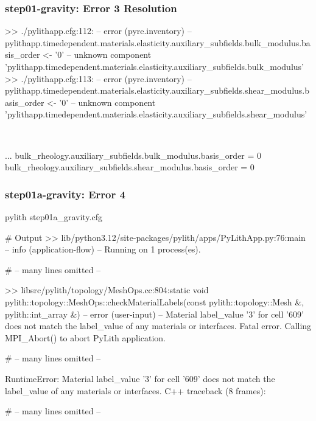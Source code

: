 \documentclass[aspectratio=169]{beamer}
\begin{document}
\begin{frame}[t,fragile]
  \frametitle{{\ttfamily step01-gravity}: Error 3 Resolution}

  \tserror
  \begin{pyrejournal}
 >> ./pylithapp.cfg:112:
 -- error (pyre.inventory)
 -- pylithapp.timedependent.materials.elasticity.auxiliary_subfields.bulk_modulus.basis_order <- '0'
 -- unknown component 'pylithapp.timedependent.materials.elasticity.auxiliary_subfields.bulk_modulus'
 >> ./pylithapp.cfg:113:
 -- error (pyre.inventory)
 -- pylithapp.timedependent.materials.elasticity.auxiliary_subfields.shear_modulus.basis_order <- '0'
 -- unknown component 'pylithapp.timedependent.materials.elasticity.auxiliary_subfields.shear_modulus'
  \end{pyrejournal}

  \pause\\[1pt]

  \begin{cfgcode}
    ...
    bulk_rheology.auxiliary_subfields.bulk_modulus.basis_order = 0
    bulk_rheology.auxiliary_subfields.shear_modulus.basis_order = 0
  \end{cfgcode}

\end{frame}



\begin{frame}[fragile]
  \frametitle{{\ttfamily step01a-gravity}: Error 4}

\begin{pyrejournal}
pylith step01a_gravity.cfg

# Output
 >> lib/python3.12/site-packages/pylith/apps/PyLithApp.py:76:main
 -- info (application-flow)
 -- Running on 1 process(es).

# -- many lines omitted --

 >> libsrc/pylith/topology/MeshOps.cc:804:static void pylith::topology::MeshOps::checkMaterialLabels(const pylith::topology::Mesh &, pylith::int_array &)
 -- error (user-input)
 -- Material label_value '3' for cell '609' does not match the label_value of any materials or interfaces.
 Fatal error. Calling MPI_Abort() to abort PyLith application.

# -- many lines omitted --

RuntimeError: Material label_value '3' for cell '609' does not match the label_value of any materials or interfaces.
C++ traceback (8 frames):

# -- many lines omitted --
\end{pyrejournal}

\end{frame}
\end{document}
